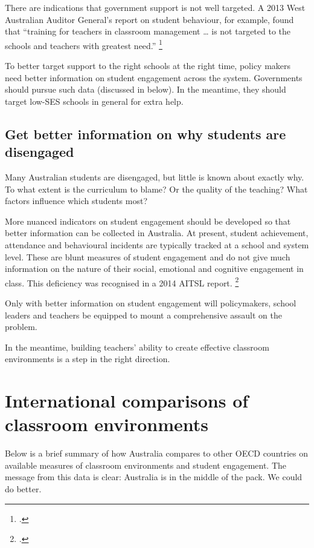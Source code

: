 \documentclass[FrontPage]{grattan}
\begin{document}
There are indications that government support is not well targeted. A 2013 West Australian Auditor General’s report on student behaviour, for example, found that ``training for teachers in classroom management \dots{} is not targeted to the schools and teachers with greatest need.''%
    \footcite{2014BehaviourManagementSchools}
 
To better target support to the right schools at the right time, policy makers need better information on student engagement across the system. Governments should pursue such data (discussed in  below). In the meantime, they should target low-SES schools in general for extra help.
 
\section{Get better information on why students are disengaged}\label{sec:get-better-information}
Many Australian students are disengaged, but little is known about exactly why. To what extent is the curriculum to blame? Or the quality of the teaching? What factors influence which students most?

More nuanced indicators on student engagement should be developed so that better information can be collected in Australia. At present, student achievement, attendance and behavioural incidents are typically tracked at a school and system level. These are blunt measures of student engagement and do not give much information on the nature of their social, emotional and cognitive engagement in class. This deficiency was recognised in a 2014 AITSL report.%
    \footcite{AITSL2014EngagementAustralianSchools}

Only with better information on student engagement will policymakers, school leaders and teachers be equipped to mount a comprehensive assault on the problem.

In the meantime, building teachers’ ability to create effective classroom environments is a step in the right direction. 

\appendix


\chapter{International comparisons of classroom environments}\label{chap:appendix-a-australia-middle-pack}
Below is a brief summary of how Australia compares to other OECD countries on available measures of classroom environments and student engagement. The message from this data is clear: Australia is in the middle of the pack. We could do better.
\end{document}
